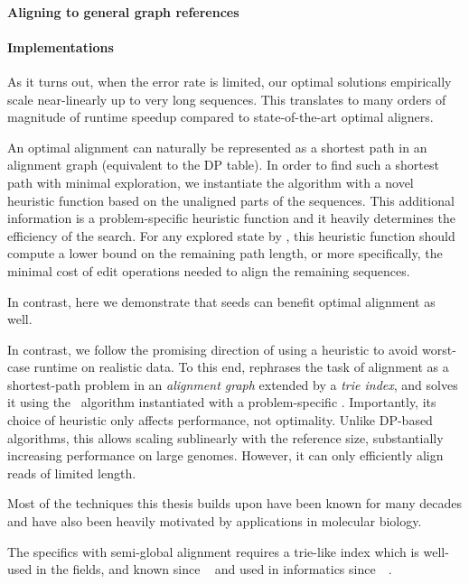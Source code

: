 \paragraph{Aligning to general graph references}

\paragraph{Implementations}




As it turns out, when the error rate is limited, our optimal solutions
empirically scale near-linearly up to very long sequences. This translates to
many orders of magnitude of runtime speedup compared to state-of-the-art optimal
aligners.

An optimal alignment can naturally be represented as a shortest path in an
alignment graph (equivalent to the DP table). In order to find such a shortest
path with minimal exploration, we instantiate the \A algorithm with a novel
heuristic function based on the unaligned parts of the sequences. This
additional information is a problem-specific heuristic function and it heavily
determines the efficiency of the search. For any explored state by \A, this
heuristic function should compute a lower bound on the remaining path length, or
more specifically, the minimal cost of edit operations needed to align the
remaining sequences.

In contrast, here we demonstrate that seeds can benefit optimal alignment as
well.

In contrast, we follow the promising direction of using a heuristic to avoid
worst-case runtime on realistic data. To this end, \astarix rephrases the task
of alignment as a shortest-path problem in an \emph{alignment graph} extended by
a \emph{trie index}, and solves it using the \A~algorithm instantiated with a
problem-specific \prefixh. Importantly, its choice of heuristic only affects
performance, not optimality.
%
Unlike DP-based algorithms, this \prefixh allows scaling sublinearly with the
reference size, substantially increasing performance on large genomes. However,
it can only efficiently align reads of limited length.

Most of the techniques this thesis builds upon have been known for many decades
and have also been heavily motivated by applications in molecular biology. 

The specifics with semi-global alignment requires a trie-like index which is
well-used in the fields, and known since
\citeyear{thue1912gegenseitige}~\cite{thue1912gegenseitige} and used in
informatics since~\citeyear{de1959file}~\cite{de1959file}.